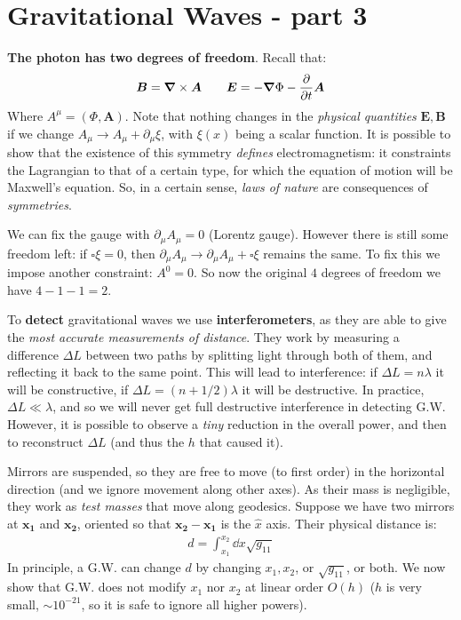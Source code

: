 \documentclass[../template.tex]{subfiles}
\begin{document}
\section{Gravitational Waves - part 3}

\begin{expl}\textbf{The photon has two degrees of freedom}. Recall that:
    \begin{align*}
        \bm{B} = \bm{\nabla} \times \bm{A} \qquad \bm{E} = -\bm{\nabla}\Phi - \pdv{t} \bm{A}
    \end{align*} 
Where $A^\mu = (\Phi, \bm{A})$. Note that nothing changes in the \textit{physical quantities} $\bm{E}, \bm{B}$ if we change $A_\mu \to A_\mu + \partial_\mu \xi$, with $\xi(x)$ being a scalar function. It is possible to show that the existence of this symmetry \textit{defines} electromagnetism: it constraints the Lagrangian to that of a certain type, for which the equation of motion will be Maxwell's equation. So, in a certain sense, \textit{laws of nature} are consequences of \textit{symmetries}. 

\medskip

We can fix the gauge with $\partial_\mu A_\mu = 0$ (Lorentz gauge). However there is still some freedom left: if $\square \xi = 0$, then $\partial_\mu A_\mu \to \partial_\mu A_\mu + \square \xi$ remains the same. To fix this we impose another constraint: $A^0 = 0$. So now the original $4$ degrees of freedom we have $4-1-1=2$. 
\end{expl}

To \textbf{detect} gravitational waves we use \textbf{interferometers}, as they are able to give the \textit{most accurate measurements of distance}. They work by measuring a difference $\Delta L$ between two paths by splitting light through both of them, and reflecting it back to the same point. This will lead to interference: if $\Delta L = n \lambda$ it will be constructive, if $\Delta L = (n+1/2) \lambda$ it will be destructive. In practice, $\Delta L \ll \lambda$, and so we will never get full destructive interference in detecting G.W. However, it is possible to observe a \textit{tiny} reduction in the overall power, and then to reconstruct $\Delta L$ (and thus the $h$ that caused it). 

Mirrors are suspended, so they are free to move (to first order) in the horizontal direction (and we ignore movement along other axes). As their mass is negligible, they work as \textit{test masses} that move along geodesics. Suppose we have two mirrors at $\bm{x_1}$ and $\bm{x_2}$, oriented so that $\bm{x_2 }- \bm{x_1 }$ is the $\hat{x}$ axis. Their physical distance is:
\begin{align*}
    d = \int_{x_1}^{x_2} \dd{x} \sqrt{g_{11} } 
\end{align*}
In principle, a G.W. can change $d$ by changing $x_1, x_2$, or $\sqrt{g_{11} }$, or both. 
\medskip
We now show that G.W. does not modify $x_1$ nor $x_2$ at linear order $O(h)$ ($h$ is very small, $\sim 10^{-21}$, so it is safe to ignore all higher powers).
\end{document}
